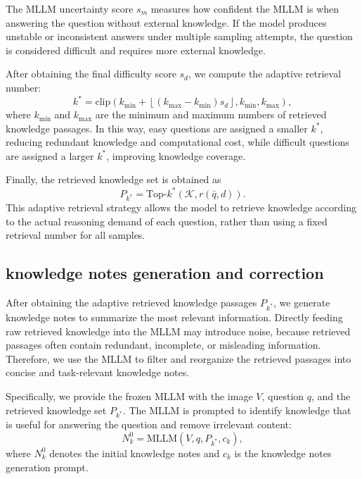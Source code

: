 \documentclass[manuscript,screen,review]{acmart}
\begin{document}
The MLLM uncertainty score $s_m$ measures how confident the MLLM is when answering the question without external knowledge. If the model produces unstable or inconsistent answers under multiple sampling attempts, the question is considered difficult and requires more external knowledge.

After obtaining the final difficulty score $s_d$, we compute the adaptive retrieval number:
\begin{equation}
k^{*} = \text{clip}\left(k_{\min} + \left\lfloor (k_{\max} - k_{\min}) s_d \right\rfloor, k_{\min}, k_{\max}\right),
\end{equation}
where $k_{\min}$ and $k_{\max}$ are the minimum and maximum numbers of retrieved knowledge passages. In this way, easy questions are assigned a smaller $k^{*}$, reducing redundant knowledge and computational cost, while difficult questions are assigned a larger $k^{*}$, improving knowledge coverage.

Finally, the retrieved knowledge set is obtained as
\begin{equation}
P_{k^{*}} = \text{Top-}k^{*}(\mathcal{K}, r(\bar{q}, d)).
\end{equation}
This adaptive retrieval strategy allows the model to retrieve knowledge according to the actual reasoning demand of each question, rather than using a fixed retrieval number for all samples.

\subsection{knowledge notes generation and correction}

After obtaining the adaptive retrieved knowledge passages $P_{k^{*}}$, we generate knowledge notes to summarize the most relevant information. Directly feeding raw retrieved knowledge into the MLLM may introduce noise, because retrieved passages often contain redundant, incomplete, or misleading information. Therefore, we use the MLLM to filter and reorganize the retrieved passages into concise and task-relevant knowledge notes.

Specifically, we provide the frozen MLLM with the image $V$, question $q$, and the retrieved knowledge set $P_{k^{*}}$. The MLLM is prompted to identify knowledge that is useful for answering the question and remove irrelevant content:
\begin{equation}
N_k^{0} = \text{MLLM}(V, q, P_{k^{*}}, c_k),
\end{equation}
where $N_k^{0}$ denotes the initial knowledge notes and $c_k$ is the knowledge notes generation prompt.
\end{document}
